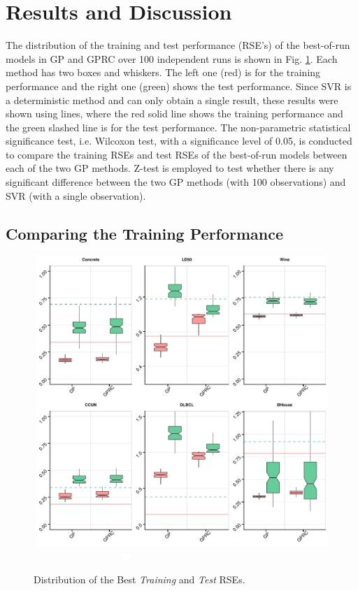\documentclass[conference]{IEEEtran}
\begin{document}
\section{Results and Discussion}
\label{se:Results}
The distribution of the training and test performance (RSE's) of the best-of-run models in GP and GPRC over 100 independent runs is shown in Fig. \ref{fig:Box}. Each method has two boxes and whiskers. The left one (red) is for the training performance and the right one (green) shows the test performance.  Since SVR is a deterministic method and can only obtain a single result, these results were shown using lines, where the red solid line shows the training performance and the green slashed line is for the test performance. The non-parametric statistical significance test, i.e. Wilcoxon test, with a significance level of 0.05, is conducted to compare the training RSEs and test RSEs of the best-of-run models between each of the two GP methods.  Z-test is employed to test whether there is any significant difference between the two GP methods (with 100 observations) and SVR (with a single observation).

\subsection{Comparing the Training Performance}

\begin{figure}[h]
	\centering
	\includegraphics[height=11cm, width=13cm]{Box}
	\includegraphics[height=0.35cm, width=7cm]{Box-Legend}
	\caption{Distribution of the Best \textit{Training} and \textit{Test} RSEs.}
	\label{fig:Box}
\end{figure}
\end{document}
